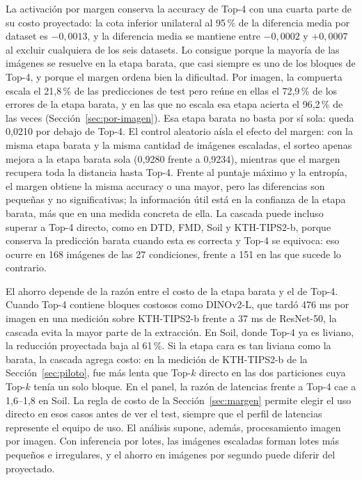 \documentclass[a4paper,fleqn]{cas-sc}
\begin{document}
La activación por margen conserva la accuracy de Top-4 con una cuarta parte de su costo proyectado: la cota inferior unilateral al 95\,\% de la diferencia media por dataset es $-0{,}0013$, y la diferencia media se mantiene entre $-0{,}0002$ y $+0{,}0007$ al excluir cualquiera de los seis datasets. Lo consigue porque la mayoría de las imágenes se resuelve en la etapa barata, que casi siempre es uno de los bloques de Top-4, y porque el margen ordena bien la dificultad. Por imagen, la compuerta escala el 21,8\,\% de las predicciones de test pero reúne en ellas el 72,9\,\% de los errores de la etapa barata, y en las que no escala esa etapa acierta el 96,2\,\% de las veces (Sección~\ref{sec:por-imagen}). Esa etapa barata no basta por sí sola: queda 0,0210 por debajo de Top-4. El control aleatorio aísla el efecto del margen: con la misma etapa barata y la misma cantidad de imágenes escaladas, el sorteo apenas mejora a la etapa barata sola (0,9280 frente a 0,9234), mientras que el margen recupera toda la distancia hasta Top-4. Frente al puntaje máximo y la entropía, el margen obtiene la misma accuracy o una mayor, pero las diferencias son pequeñas y no significativas; la información útil está en la confianza de la etapa barata, más que en una medida concreta de ella. La cascada puede incluso superar a Top-4 directo, como en DTD, FMD, Soil y KTH-TIPS2-b, porque conserva la predicción barata cuando esta es correcta y Top-4 se equivoca: eso ocurre en 168 imágenes de las 27 condiciones, frente a 151 en las que sucede lo contrario.

El ahorro depende de la razón entre el costo de la etapa barata y el de Top-4. Cuando Top-4 contiene bloques costosos como DINOv2-L, que tardó 476 ms por imagen en una medición sobre KTH-TIPS2-b frente a 37 ms de ResNet-50, la cascada evita la mayor parte de la extracción. En Soil, donde Top-4 ya es liviano, la reducción proyectada baja al 61\,\%. Si la etapa cara es tan liviana como la barata, la cascada agrega costo: en la medición de KTH-TIPS2-b de la Sección~\ref{sec:piloto}, fue más lenta que Top-$k$ directo en las dos particiones cuya Top-$k$ tenía un solo bloque. En el panel, la razón de latencias frente a Top-4 cae a 1,6--1,8 en Soil. La regla de costo de la Sección~\ref{sec:margen} permite elegir el uso directo en esos casos antes de ver el test, siempre que el perfil de latencias represente el equipo de uso. El análisis supone, además, procesamiento imagen por imagen. Con inferencia por lotes, las imágenes escaladas forman lotes más pequeños e irregulares, y el ahorro en imágenes por segundo puede diferir del proyectado.
\end{document}
